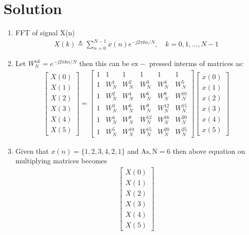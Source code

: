 \documentclass[journal,12pt,twocolumn]{IEEEtran}
\renewcommand\thesection{\arabic{section}}
\begin{document}
\section{Solution}
\begin{enumerate}[label=\thesection.\arabic*.,ref=\thesection.\theenumi]
    \item FFT of signal X(n) 
    \begin{align}
        X(k) \triangleq \sum_{n=0}^{N-1} x(n) e^{-j 2 \pi k n / N}, \quad k=0,1, \ldots, N-1
    \end{align}
    \item Let $W_{N}^{n k}=e^{-j 2 \pi k n / N}$ then this can be $\mathrm{ex}-$ pressed interms of matrices as:
    \begin{align}
        \begin{bmatrix} X(0) \\ X(1) \\ X(2) \\ X(3) \\ X(4) \\ X(5) \end{bmatrix}
=
\begin{bmatrix}
1 & 1 & 1 & 1 & 1 & 1 \\ 1 & W_N^1& W_N^2& W_N^3 & W_N^4 & W_N^5\\1 & W_N^2 & W_N^4 & W_N^6 & W_N^8 & W_N^{10}\\1 & W_N^3 & W_N^6 & W_N^9 & W_N^{12} & W_N^{15}\\1 & W_N^4 & W_N^8 & W_N^{12} & W_N^{16} & W_N^{20}\\1 & W_N^5 & W_N^{10} & W_N^{15} & W_N^{20} &W_N^{25}
\end{bmatrix}%
\begin{bmatrix}
x(0) \\ x(1) \\ x(2) \\ x(3) \\ x(4) \\x(5)
\end{bmatrix}
    \end{align}
 \item Given that $x(n)=\{1,2,3,4,2,1\}$
and $\mathrm{As}, \mathrm{N}=6$ then above equation on multiplying matrices becomes
\begin{align}
    \begin{bmatrix} X(0) \\ X(1) \\ X(2) \\ X(3) \\ X(4) \\ X(5) \end{bmatrix}

\end{align}
\end{enumerate}
\end{document}
